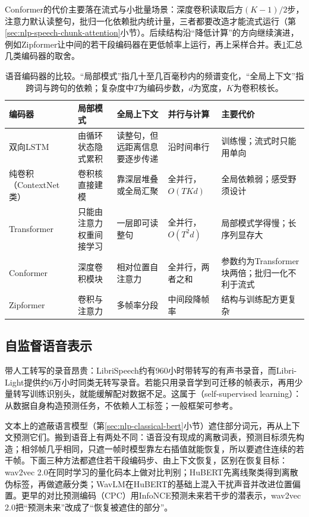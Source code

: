 Conformer的代价主要落在流式与小批量场景：深度卷积读取后方$(K-1)/2$步，注意力默认读整句，批归一化依赖批内统计量，三者都要改造才能流式运行（第\ref{sec:nlp-speech-chunk-attention}小节）。后续结构沿“降低计算”的方向继续演进，例如Zipformer让中间的若干段编码器在更低帧率上运行，再上采样合并\cite{nlp-speech-yao2024zipformer}。表\ref{tab:nlp-speech-encoders}汇总几类编码器的取舍。

\begin{table}[htbp]
  \centering
  \small
  \begin{tabularx}{\linewidth}{@{}p{22mm}>{\raggedright\arraybackslash}X>{\raggedright\arraybackslash}X>{\raggedright\arraybackslash}X>{\raggedright\arraybackslash}X@{}}
    \toprule
    编码器 & 局部模式 & 全局上下文 & 并行与计算 & 主要代价\\
    \midrule
    双向LSTM & 由循环状态隐式累积 & 读整句，但远距离信息要逐步传递 & 沿时间串行 & 训练慢；流式时只能用单向\\
    纯卷积（ContextNet类） & 卷积核直接建模 & 靠深层堆叠或全局汇聚 & 全并行，$O(TKd)$ & 全局依赖弱；感受野须设计\\
    Transformer & 只能由注意力权重间接学习 & 一层即可读整句 & 全并行，$O(T^2d)$ & 局部模式学得慢；长序列显存大\\
    Conformer & 深度卷积模块 & 相对位置自注意力 & 全并行，两者之和 & 参数约为Transformer块两倍；批归一化不利于流式\\
    Zipformer & 卷积与注意力 & 多帧率分段 & 中间段降帧率 & 结构与训练配方更复杂\\
    \bottomrule
  \end{tabularx}
  \caption{语音编码器的比较。“局部模式”指几十至几百毫秒内的频谱变化，“全局上下文”指跨词与跨句的依赖；复杂度中$T$为编码步数，$d$为宽度，$K$为卷积核长。}
  \label{tab:nlp-speech-encoders}
\end{table}

\subsection{自监督语音表示}
\label{sec:nlp-speech-ssl}

带人工转写的录音昂贵：LibriSpeech约有960小时带转写的有声书录音，而Libri-Light提供约6万小时同类无转写录音。若能只用录音学到可迁移的帧表示，再用少量转写训练识别头，就能缓解配对数据不足。这属于（self-supervised learning）：从数据自身构造预测任务，不依赖人工标签；一般框架可参考。

文本上的遮蔽语言模型（第\ref{sec:nlp-classical-bert}小节）遮住部分词元，再从上下文预测它们。搬到语音上有两处不同：语音没有现成的离散词表，预测目标须先构造；相邻帧几乎相同，只遮一帧时模型靠左右插值就能恢复，所以要遮住连续的若干帧。下面三种方法都遮住若干段编码步、由上下文恢复，区别在恢复目标：wav2vec 2.0在同时学习的量化码本上做对比判别\cite{nlp-speech-baevski2020wav2vec2}；HuBERT先离线聚类得到离散伪标签，再做遮蔽分类\cite{nlp-speech-hsu2021hubert}；WavLM在HuBERT的基础上混入干扰声音并改进位置偏置\cite{nlp-speech-chen2022wavlm}。更早的对比预测编码（CPC）用InfoNCE预测未来若干步的潜表示\cite{nlp-matching-oord2018cpc}，wav2vec 2.0把“预测未来”改成了“恢复被遮住的部分”。

